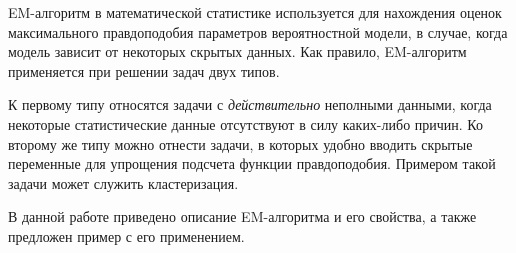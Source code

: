 EM-алгоритм в математической статистике используется для нахождения оценок максимального правдоподобия параметров вероятностной модели, в случае, когда модель зависит от некоторых скрытых данных. Как правило, EM-алгоритм применяется при решении задач двух типов.

К первому типу относятся задачи с \emph{действительно} неполными данными, когда некоторые статистические данные отсутствуют в силу каких-либо причин. Ко второму же типу можно отнести задачи, в которых удобно вводить скрытые переменные для упрощения подсчета функции правдоподобия. Примером такой задачи может служить кластеризация.

В данной работе приведено описание EM-алгоритма и его свойства, а также предложен пример с его применением. 